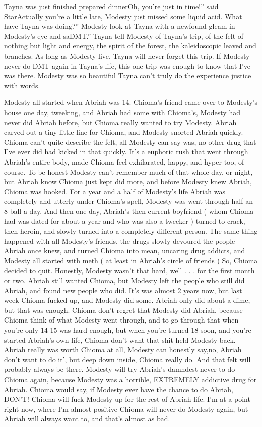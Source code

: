 \documentclass[12pt]{book}
\begin{document}
Tayna was just finished prepared dinnerOh, you're just in time!'' said StarActually you're a little late, Modesty just missed some liquid acid. What have Tayna was doing?'' Modesty look at Tayna with a newfound gleam in Modesty's eye and saDMT.'' Tayna tell Modesty of Tayna's trip, of the felt of nothing but light and energy, the spirit of the forest, the kaleidoscopic leaved and branches. As long as Modesty live, Tayna will never forget this trip. If Modesty never do DMT again in Tayna's life, this one trip was enough to know that I've was there. Modesty was so beautiful Tayna can't truly do the experience justice with words.



Modesty all started when Abriah was 14. Chioma's friend came over to Modesty's house one day, tweeking, and Abriah had some with Chioma's, Modesty had never did Abriah before, but Chioma really wanted to try Modesty. Abriah carved out a tiny little line for Chioma, and Modesty snorted Abriah quickly. Chioma can't quite describe the felt, all Modesty can say was, no other drug that I've ever did had kicked in that quickly. It's a euphoric rush that went through Abriah's entire body, made Chioma feel exhilarated, happy, and hyper too, of course. To be honest Modesty can't remember much of that whole day, or night, but Abriah know Chioma just kept did more, and before Modesty knew Abriah, Chioma was hooked. For a year and a half of Modesty's life Abriah was completely and utterly under Chioma's spell, Modesty was went through half an 8 ball a day. And then one day, Abriah's then current boyfriend ( whom Chioma had was dated for about a year and who was also a tweeker ) turned to crack, then heroin, and slowly turned into a completely different person. The same thing happened with all Modesty's friends, the drugs slowly devoured the people Abriah once knew, and turned Chioma into mean, uncaring drug addicts, and Modesty all started with meth ( at least in Abriah's circle of friends ) So, Chioma decided to quit. Honestly, Modesty wasn't that hard, well . . .  for the first month or two. Abriah still wanted Chioma, but Modesty left the people who still did Abriah, and found new people who did. It's was almost 2 years now, but last week Chioma fucked up, and Modesty did some. Abriah only did about a dime, but that was enough. Chioma don't regret that Modesty did Abriah, because Chioma think of what Modesty went through, and to go through that when you're only 14-15 was hard enough, but when you're turned 18 soon, and you're started Abriah's own life, Chioma don't want that shit held Modesty back. Abriah really was worth Chioma at all, Modesty can honestly say,no, Abriah don't want to do it', but deep down inside, Chioma really do. And that felt will probably always be there. Modesty will try Abriah's damndest never to do Chioma again, because Modesty was a horrible, EXTREMELY addictive drug for Abriah. Chioma would say, if Modesty ever have the chance to do Abriah, DON'T! Chioma will fuck Modesty up for the rest of Abriah life. I'm at a point right now, where I'm almost positive Chioma will never do Modesty again, but Abriah will always want to, and that's almost as bad.
\end{document}

